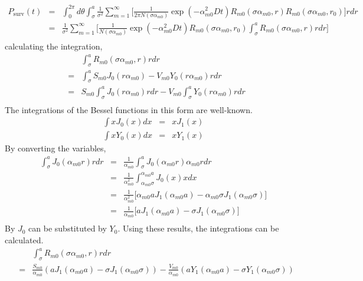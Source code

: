 \documentclass{article}
\begin{document}
\begin{eqnarray}
    P_{\mathrm{surv}}(t)
        &=& \int_0^{2\pi}d\theta \int_\sigma^a \frac{1}{\sigma^2} \sum_{m=1}^{\infty} \Bigg[
            \frac{1}{2\pi N(\sigma\alpha_{m0})} \exp(-\alpha_{m0}^2Dt)
            R_{m0}(\sigma\alpha_{m0}, r) R_{m0}(\sigma\alpha_{m0}, r_0)
            \Bigg] rdr \nonumber\\
        &=& \frac{1}{\sigma^2} \sum_{m=1}^{\infty} \Bigg[
            \frac{1}{N(\sigma\alpha_{m0})} \exp(-\alpha_{m0}^2Dt)
            R_{m0}(\sigma\alpha_{m0}, r_0)
            \int_\sigma^a R_{m0}(\sigma\alpha_{m0}, r) rdr \Bigg] \nonumber\\
\end{eqnarray}
%
calculating the integration,
%
\begin{eqnarray}
    & & \int_\sigma^a R_{m0}(\sigma\alpha_{m0}, r) rdr \nonumber\\
    &=& \int_\sigma^a S_{m0}J_0(r\alpha_{m0}) - V_{m0}Y_0(r\alpha_{m0}) rdr \nonumber\\
    &=& S_{m0} \int_\sigma^a J_0(r\alpha_{m0}) rdr -
        V_{m0} \int_\sigma^a Y_0(r\alpha_{m0}) rdr \nonumber\\
%
\end{eqnarray}
%
The integrations of the Bessel functions in this form are well-known.
%
\begin{eqnarray}
    \int xJ_0(x) dx &=& xJ_1(x)\\
    \int xY_0(x) dx &=& xY_1(x)
\end{eqnarray}
%
By converting the variables,
%
\begin{eqnarray}
    \int_\sigma^a J_0(\alpha_{m0}r) rdr
    &=& \frac{1}{\alpha_{m0}}  \int_\sigma^a J_0(\alpha_{m0}r) \alpha_{m0}r dr \\
    &=& \frac{1}{\alpha_{m0}^2}\int_{\alpha_{m0}\sigma}^{\alpha_{m0}a} J_0(x) x dx \\
    &=& \frac{1}{\alpha_{m0}^2}\Big[\alpha_{m0}a J_1(\alpha_{m0}a) - \alpha_{m0}\sigma J_1(\alpha_{m0}\sigma) \Big] \\
    &=& \frac{1}{\alpha_{m0}}  \Big[aJ_1(\alpha_{m0}a) - \sigma J_1(\alpha_{m0}\sigma) \Big] \\
\end{eqnarray}
%
By $J_0$ can be substituted by $Y_0$.
Using these results, the integrations can be calculated.
%
\begin{eqnarray}
    & & \int_\sigma^a R_{m0}(\sigma\alpha_{m0}, r) rdr \nonumber\\
    &=& \frac{S_{m0}}{\alpha_{m0}} \left(aJ_1(\alpha_{m0}a) - \sigma J_1(\alpha_{m0}\sigma)\right) -
        \frac{V_{m0}}{\alpha_{m0}} \left(aY_1(\alpha_{m0}a) - \sigma Y_1(\alpha_{m0}\sigma)\right) \nonumber
\end{eqnarray}
\end{document}
